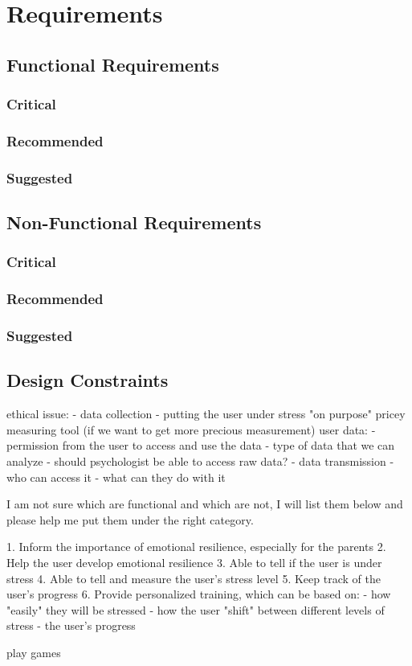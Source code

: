 \chapter{Requirements}

\section{Functional Requirements}
    \subsection{Critical}
    \subsection{Recommended}
    \subsection{Suggested}

\section{Non-Functional Requirements}
    \subsection{Critical}
    \subsection{Recommended}
    \subsection{Suggested}

\section{Design Constraints}
ethical issue:
	- data collection
    - putting the user under stress "on purpose"
pricey measuring tool (if we want to get more precious measurement)
user data:
	- permission from the user to access and use the data
    - type of data that we can analyze
	- should psychologist be able to access raw data?
	- data transmission
	- who can access it
    - what can they do with it

I am not sure which are functional and which are not, I will list them below and please help me put them under the right category.

1. Inform the importance of emotional resilience, especially for the parents
2. Help the user develop emotional resilience
3. Able to tell if the user is under stress
4. Able to tell and measure the user's stress level
5. Keep track of the user's progress
6. Provide personalized training, which can be based on:
     - how "easily" they will be stressed
     - how the user "shift" between different levels of stress
     - the user's progress
     
     play games
     
     